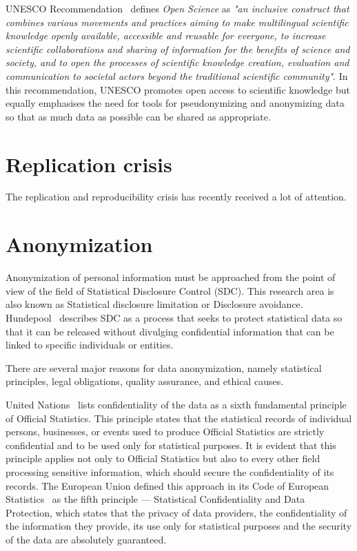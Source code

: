 \documentclass{article}
\begin{document}
UNESCO Recommendation~\cite{2022_EUA} defines \textit{Open Science} as \textit{"an
inclusive construct that combines various movements and practices aiming
to make multilingual scientific knowledge openly available, accessible and
reusable for everyone, to increase scientific collaborations and sharing of
information for the benefits of science and society, and to open the processes of scientific knowledge creation, evaluation and communication to societal actors beyond the traditional scientific community"}. In this recommendation, UNESCO promotes open access to scientific knowledge but equally emphasises the need for tools for pseudonymizing and anonymizing data so that as much data as possible can be shared as appropriate.


\section{Replication crisis}
The replication and reproducibility crisis has recently received a lot of attention.

\section{Anonymization}

Anonymization of personal information must be approached from the point of view 
of the field of Statistical Disclosure Control (SDC). This research area is also known as Statistical disclosure limitation or Disclosure avoidance.
Hundepool~\cite{2012_Hundepool} describes SDC as a process that seeks to protect statistical data so that it can be released without divulging confidential information that can be linked to specific individuals or entities.

There are several major reasons for data anonymization, namely statistical principles, legal obligations, quality assurance, and ethical causes. 

United Nations~\cite{2015_UN} lists confidentiality of the data as a sixth fundamental principle of Official Statistics. This principle states that the statistical records of individual persons, businesses, or events used to produce Official Statistics are strictly confidential and to be used only for statistical purposes. It is evident that this principle applies not only to Official Statistics but also to every other field processing sensitive information, which should secure the confidentiality of its records. The European Union defined this approach in its Code of European Statistics~\cite{2018_Eurostat} as the fifth principle — Statistical Confidentiality and Data Protection, which states that the privacy of data providers, the confidentiality of the information they provide, its use only for statistical purposes and the security of the data are absolutely guaranteed.
\end{document}
